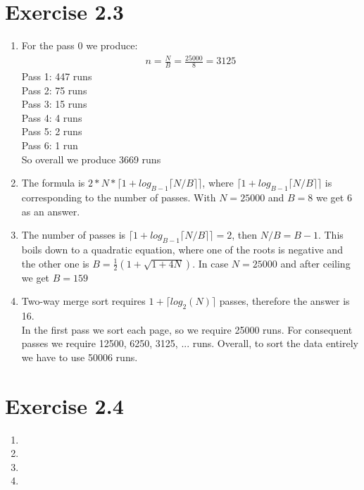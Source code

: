 \documentclass[10pt]{article}
\begin{document}
  \section*{Exercise 2.3}
   \begin{enumerate}[label=\arabic*.]
      \item
      	For the pass 0 we produce:
        \begin{align}
          n = \frac{N}{B} = \frac{25000}{8} = 3125
        \end{align}
        Pass 1: 447 runs\\
        Pass 2: 75 runs\\
        Pass 3: 15 runs\\
        Pass 4: 4 runs\\
        Pass 5: 2 runs\\
        Pass 6: 1 run\\[3pt]
        So overall we produce 3669 runs
      \item
        The formula is $2*N*\lceil 1+log_{B-1} \lceil N/B \rceil \rceil$, where
        $\lceil 1+log_{B-1} \lceil N/B \rceil \rceil$ is corresponding to the number
        of passes. With $N = 25000$ and $B = 8$ we get $6$ as an answer.
      \item
      	The number of passes is $\lceil 1+log_{B-1} \lceil N/B \rceil \rceil = 2$,
        then $N/B = B-1$. This boils down to a quadratic equation, where one of the
        roots is negative and the other one is $B = \frac{1}{2}(1+\sqrt{1+4N})$. In case $N = 25000$
        and after ceiling we get $B = 159$
      \item
        Two-way merge sort requires $1 + \lceil log_2(N) \rceil$ passes, therefore
        the answer is 16. \\
        In the first pass we sort each page, so we require 25000 runs. For consequent passes we require 12500, 6250, 3125, ... runs. Overall, to sort the data entirely we have to use 50006 runs.
  \end{enumerate}

  \section*{Exercise 2.4}
   \begin{enumerate}[label=\arabic*.]
      \item

      \item

      \item

      \item

  \end{enumerate}
\end{document}
